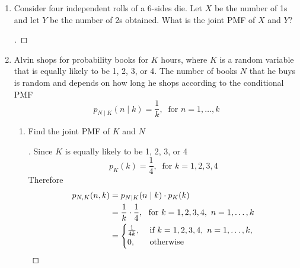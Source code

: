 \documentclass[paper=usletter, fontsize=12pt]{article}
\begin{document}
\begin{enumerate}[label=\textbf{\arabic*}.]
        \item
        Consider four independent rolls of a 6-sides die. Let $X$ be the number
        of 1s and let $Y$ be the number of 2s obtained. What is the joint PMF
        of $X$ and $Y$?
        \begin{proof}[\unskip\nopunct]
        \end{proof}
        \vspace{0.2in}

        \item
        Alvin shops for probability books for $K$ hours, where $K$ is a random
        variable that is equally likely to be 1, 2, 3, or 4. The number of
        books $N$ that he buys is random and depends on how long he shops
        according to the conditional PMF
        \begin{equation*}
            p_{N \mid K}(n \mid k) = \frac{1}{k}, \ \text{ for } n=1,\ldots,k
        \end{equation*}
        \begin{enumerate}[label=(\alph*)]

            \item Find the joint PMF of $K$ and $N$
            \begin{proof}[\unskip\nopunct]
                Since $K$ is equally likely to be 1, 2, 3, or 4
                \begin{equation*}
                    p_K(k) = \frac{1}{4}, \ \text{ for } k=1,2,3,4
                \end{equation*}
                Therefore
                \begingroup
                \addtolength{\jot}{1em}
                \begin{align*}
                    p_{N , K}(n , k) & = p_{N \mid K}(n \mid k) \cdot p_K(k)\\
                    & = \frac{1}{k}\cdot \frac{1}{4}, \ \text{ for } k=1,2,3,4, \ n=1,\ldots,k \\
                    & = \begin{cases}
                        \frac{1}{4k}, & \text{ if } k=1,2,3,4, \ n=1,\ldots,k,\\
                        0, & \text{ otherwise } \qedhere
                    \end{cases}
                \end{align*}
                \endgroup
            \end{proof}
            \vspace{0.2in}


\end{enumerate}
\end{enumerate}
\end{document}
